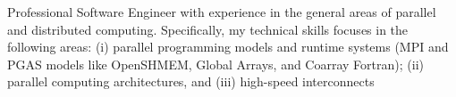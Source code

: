 Professional Software Engineer with experience in the general areas of parallel
and distributed computing. Specifically, my technical skills focuses in the
following areas:
(i)   parallel programming models and runtime systems (MPI and PGAS models like
      OpenSHMEM, Global Arrays, and Coarray Fortran);
(ii)  parallel computing architectures, and
(iii) high-speed interconnects
